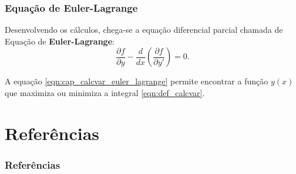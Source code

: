\documentclass{beamer}
\begin{document}
\begin{frame}
	\frametitle{Equação de Euler-Lagrange}
	
	Desenvolvendo os cálculos, chega-se a equação diferencial parcial chamada de Equação de \textbf{Euler-Lagrange}:
	\begin{equation}
		\label{eqn:cap_calcvar_euler_lagrange}
		\frac{\partial f}{\partial y} - \frac{d}{dx} \left ( \frac{\partial f}{\partial y'} \right )=0 \text{.}
	\end{equation}
	
	A equação \eqref{eqn:cap_calcvar_euler_lagrange} permite encontrar a função $y(x)$ que maximiza ou minimiza a integral \eqref{eqn:def_calcvar}.
\end{frame}

\nocite{boyer}
\nocite{hist_still}
\nocite{hist_courant}
\nocite{mefassan}

\section{Referências}
\begin{frame}
	\frametitle{Referências}
	
\end{frame}
\end{document}
